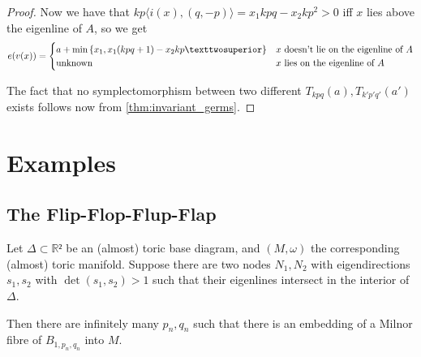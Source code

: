 \documentclass[12pt,a4paper,draft]{scrartcl}
\begin{document}
\begin{proof}
  Now we have that $kp⟨i(x),(q,-p)⟩ = x_1 kpq - x_2 kp^2 > 0$ iff $x$ lies above the eigenline of $A$, so we get
  \[e(v(x)) = \begin{cases}
    a + \min\qty{x_1,x_1(kpq+1) - x_2kp²} & \text{$x$ doesn't lie on the eigenline of $A$}\\
    \text{unknown} & \text{$x$ lies on the eigenline of $A$}\\
  \end{cases}\]

  The fact that no symplectomorphism between two different $T_{kpq}(a), T_{k'p'q'}(a')$ exists follows now from \cref{thm:invariant_germs}.
\end{proof}

\section{Examples}

\subsection{The Flip-Flop-Flup-Flap}


\begin{proposition}
  Let $Δ ⊂ ℝ²$ be an (almost) toric base diagram, and $(M,ω)$ the corresponding (almost) toric manifold.
Suppose there are two nodes $N_1,N_2$ with eigendirections $s_1,s_2$ with $\det(s_1,s_2)>1$ such that their eigenlines intersect in the interior of $Δ$.

Then there are infinitely many $p_n,q_n$ such that there is an embedding of a Milnor fibre of $B_{1,p_n,q_n}$ into $M$.
\end{proposition}
\end{document}
